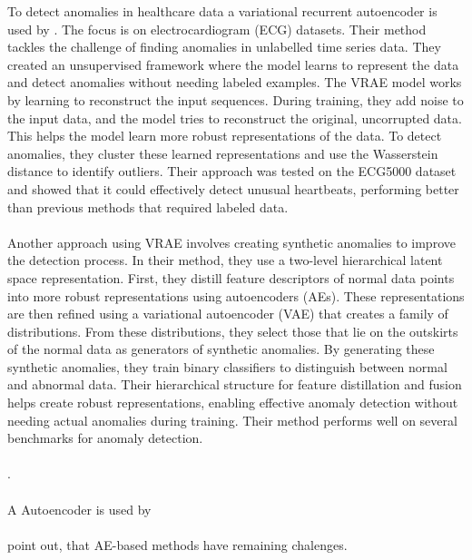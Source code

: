 To detect anomalies in healthcare data a variational recurrent autoencoder is used by . %
The focus is on electrocardiogram (ECG) datasets. Their method tackles the challenge of finding anomalies in unlabelled time series data. They created an unsupervised framework where the model learns to represent the data and detect anomalies without needing labeled examples.
The VRAE model works by learning to reconstruct the input sequences. During training, they add noise to the input data, and the model tries to reconstruct the original, uncorrupted data. This helps the model learn more robust representations of the data. To detect anomalies, they cluster these learned representations and use the Wasserstein distance to identify outliers. Their approach was tested on the ECG5000 dataset and showed that it could effectively detect unusual heartbeats, performing better than previous methods that required labeled data. \\\\
Another approach using VRAE involves creating synthetic anomalies to improve the detection process. In their method, they use a two-level hierarchical latent space representation. First, they distill feature descriptors of normal data points into more robust representations using autoencoders (AEs). These representations are then refined using a variational autoencoder (VAE) that creates a family of distributions. From these distributions, they select those that lie on the outskirts of the normal data as generators of synthetic anomalies.
By generating these synthetic anomalies, they train binary classifiers to distinguish between normal and abnormal data. Their hierarchical structure for feature distillation and fusion helps create robust representations, enabling effective anomaly detection without needing actual anomalies during training. Their method performs well on several benchmarks for anomaly detection.\\\\
 \cite{ramirez_rivera_anomaly_2022}. \\\\
A Autoencoder is used by \cite{pranavan_contrastive_2022} \\\\%
 point out, that AE-based methods have remaining chalenges.
